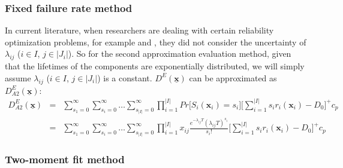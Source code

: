 \documentclass[preprint,12pt]{elsarticle}
\begin{document}
\subsubsection{Fixed failure rate method}
In current literature, when researchers are dealing with certain reliability optimization problems, for example \citet{Mettas} \citet{Oner2010} and \citet{Huang}, they did not consider the uncertainty of $\lambda_{ij}$ ($i \in I$, $j \in \rvert J_{i} \lvert$). So for the second approximation evaluation method, given that the lifetimes of the components are exponentially distributed, we will simply assume $\lambda_{ij}$ ($i \in I$, $j \in \rvert J_{i} \lvert$) is a constant. $D^{E}(\boldsymbol{\underline{x}})$ can be approximated as $D^{E}_{A2}(\boldsymbol{\underline{x}})$:
\small
\begin{eqnarray}
D^{E}_{A2}(\boldsymbol{\underline{x}}) &=&\sum_{s_{1}=0}^{\infty}\sum_{s_{i}=0}^{\infty}\dots\sum_{s_{\rvert I \lvert}=0}^{\infty}{\prod_{i=1}^{\rvert I \lvert} {Pr\bigg[S_{i}(\boldsymbol{x}_{i})=s_{i}\bigg]}} \bigg[\sum_{i=1}^{\rvert I \lvert}{s_{i}r_{i}(\boldsymbol{x}_{i})}-D_{0}\bigg]^{+}c_{p} \nonumber\\
&=& \sum_{s_{1}=0}^{\infty}\sum_{s_{i}=0}^{\infty}\dots\sum_{s_{\rvert I \lvert}=0}^{\infty}{\prod_{i=1}^{\rvert I \lvert} {x_{ij}\frac{e^{-\lambda_{ij}T}(\lambda_{ij}T)^{s_{i}}}{s_{i}!}}}\bigg[\sum_{i=1}^{\rvert I \lvert}{s_{i}r_{i}(\boldsymbol{x}_{i})}-D_{0}\bigg]^{+}c_{p}
\end{eqnarray}
\normalsize
\subsubsection{Two-moment fit method}
\end{document}
